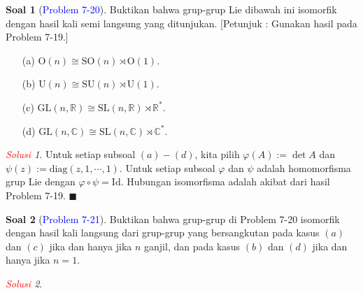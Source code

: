 \documentclass[11pt]{article}
\theoremstyle{definition}
\newtheorem*{problem}{Soal}
\theoremstyle{remark}
\newtheorem*{solution}{\textcolor{red}{Solusi}}
\newcommand{\er}{\mathbb{R}}            %
\newcommand{\C}{\mathbb{C}}             %
\newcommand{\GLnr}{\text{GL}(n,\mathbb{R})} %
\newcommand{\GLnc}{\text{GL}(n,\mathbb{C})} %
\newcommand{\SLnr}{\text{SL}(n,\mathbb{R})} %
\newcommand{\SLnc}{\text{SL}(n,\mathbb{C})} %
\newcommand{\On}{\text{O}(n)}               %
\newcommand{\Un}{\text{U}(n)}               %
\newcommand{\SUn}{\text{SU}(n)}             %
\newcommand{\SOn}{\text{SO}(n)}             %
\newcommand{\Id}{\text{Id}}                 %
\begin{document}
\begin{problem}[\textcolor{blue}{Problem 7-20}] 
Buktikan bahwa grup-grup Lie dibawah ini isomorfik dengan hasil kali semi langsung yang ditunjukan. [Petunjuk : Gunakan hasil pada Problem 7-19.]
\begin{enumerate}
    \item [(a)] $\On \cong \SOn \rtimes \text{O}(1)$.
    \item [(b)] $\Un \cong \SUn \rtimes \text{U}(1)$.
    \item [(c)] $\GLnr \cong \SLnr \rtimes \er^*$.
    \item [(d)] $\GLnc \cong \SLnc \rtimes \C^*$.
\end{enumerate}
\end{problem}
\begin{solution}
Untuk setiap subsoal $(a)-(d)$, kita pilih $\varphi(A):= \det A$ dan $\psi(z):=\text{diag}(z,1,\cdots,1)$. Untuk setiap subsoal $\varphi$ dan $\psi$ adalah homomorfisma grup Lie dengan $ \varphi \circ \psi = \Id$. Hubungan isomorfisma adalah akibat dari hasil Problem 7-19. $\blacksquare$
\end{solution}

\begin{problem}[\textcolor{blue}{Problem 7-21}]
Buktikan bahwa grup-grup di Problem 7-20 isomorfik dengan hasil kali langsung dari grup-grup yang bersangkutan pada kasus $(a)$ dan $(c)$ jika dan hanya jika $n$ ganjil, dan pada kasus $(b)$ dan $(d)$ jika dan hanya jika $n = 1$.
\end{problem}
\begin{solution}

\end{solution}
\end{document}
